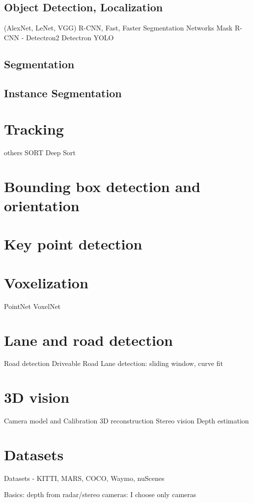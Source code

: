 \subsection{Object Detection, Localization}
    (AlexNet, LeNet, VGG)
    R-CNN, Fast, Faster
    Segmentation Networks
    Mask R-CNN - Detectron2
    Detectron
    YOLO
\subsection{Segmentation}
\subsection{Instance Segmentation}
\section{Tracking}
others
SORT
Deep Sort
\section{Bounding box detection and orientation}
\section{Key point detection}
\section{Voxelization }
PointNet
VoxelNet
\section{Lane and road detection}
Road detection
Driveable Road
Lane detection: sliding window, curve fit
\section{3D vision}
Camera model and Calibration
3D reconstruction
Stereo vision
Depth estimation
\section{Datasets}
Datasets - KITTI, MARS, COCO, Waymo, nuScenes


Basics: depth from radar/stereo cameras: I choose only cameras










